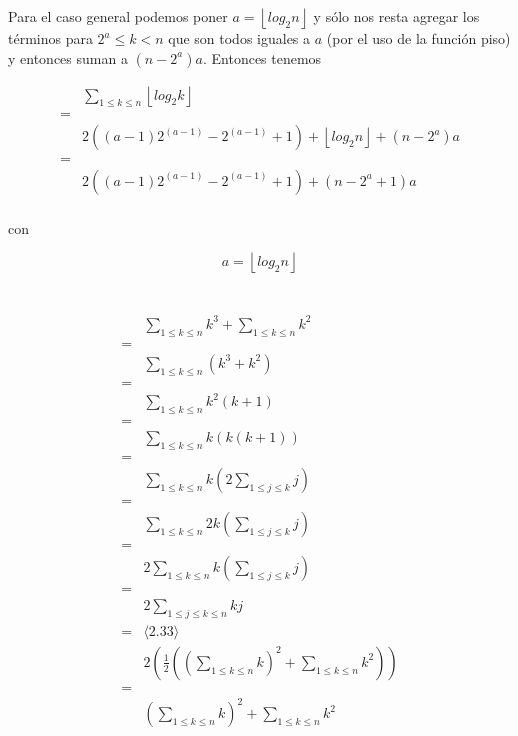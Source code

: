 \documentclass{article}
\newcommand{\piso}[1]{\left \lfloor #1 \right \rfloor}
\begin{document}
Para el caso general podemos poner $a = \piso{log_2n}$ y sólo nos resta agregar
los términos para $2^a \leq k < n$ que son todos iguales a $a$ (por el uso de la
función piso) y entonces suman a $(n-2^a)a$. Entonces tenemos

\begin{align*}
 & \sum_{1 \leq k \leq n} \piso{log_2k} \\
 = & \\
 & 2((a-1)2^{(a-1)} - 2^{(a-1)} +1) + \piso{log_2n} + (n-2^a)a \\
 = & \\
 & 2((a-1)2^{(a-1)} - 2^{(a-1)} +1) + (n-2^a+1)a \\
\end{align*}

con

$$
a = \piso{log_2n}
$$

\newpage

\section{}

\begin{align*}
 & \sum_{1 \leq k \leq n} k^3 + \sum_{1 \leq k \leq n} k^2 \\
 = & \\
 & \sum_{1 \leq k \leq n}(k^3+k^2) \\
 = & \\
 & \sum_{1 \leq k \leq n}k^2(k+1) \\
 = & \\
 & \sum_{1 \leq k \leq n}k(k(k+1)) \\
 = & \\
 & \sum_{1 \leq k \leq n}k\left(2 \sum_{1 \leq j \leq k} j\right) \\
 = & \\
 & \sum_{1 \leq k \leq n}2k\left(\sum_{1 \leq j \leq k} j\right) \\
 = & \\
 & 2\sum_{1 \leq k \leq n}k\left(\sum_{1 \leq j \leq k} j\right) \\
 = & \\
 & 2\sum_{1 \leq j \leq k \leq n}kj \\
 = & \langle \text{2.33} \rangle \\
 & 2\left(\frac{1}{2}\left(\left(\sum_{1 \leq k \leq n} k \right)^2 + \sum_{1 \leq k \leq n}k^2 \right)\right) \\
 = & \\
 & \left(\sum_{1 \leq k \leq n} k \right)^2 + \sum_{1 \leq k \leq n}k^2 \\
\end{align*}
\end{document}
